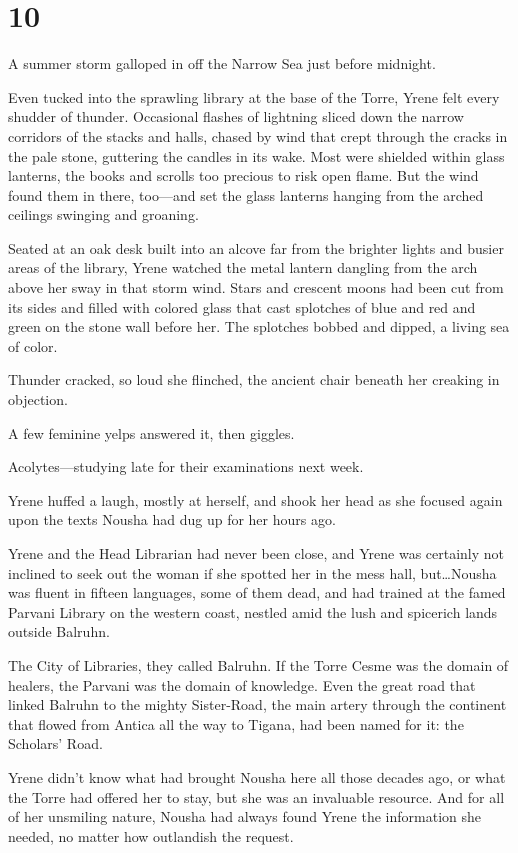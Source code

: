 
\chapter{10}

A summer storm galloped in off the Narrow Sea just before midnight.

Even tucked into the sprawling library at the base of the Torre, Yrene felt every shudder of thunder.
Occasional flashes of lightning sliced down the narrow corridors of the stacks and halls, chased by wind that crept through the cracks in the pale stone, guttering the candles in its wake.
Most were shielded within glass lanterns, the books and scrolls too precious to risk open flame.
But the wind found them in there, too---and set the glass lanterns hanging from the arched ceilings swinging and groaning.

Seated at an oak desk built into an alcove far from the brighter lights and busier areas of the library, Yrene watched the metal lantern dangling from the arch above her sway in that storm wind.
Stars and crescent moons had been cut from its sides and filled with colored glass that cast splotches of blue and red and green on the stone wall before her.
The splotches bobbed and dipped, a living sea of color.

Thunder cracked, so loud she flinched, the ancient chair beneath her creaking in objection.

A few feminine yelps answered it, then giggles.

Acolytes---studying late for their examinations next week.

Yrene huffed a laugh, mostly at herself, and shook her head as she focused again upon the texts Nousha had dug up for her hours ago.

Yrene and the Head Librarian had never been close, and Yrene was certainly not inclined to seek out the woman if she spotted her in the mess hall, but\ldots Nousha was fluent in fifteen languages, some of them dead, and had trained at the famed Parvani Library on the western coast, nestled amid the lush and spicerich lands outside Balruhn.

The City of Libraries, they called Balruhn.
If the Torre Cesme was the domain of healers, the Parvani was the domain of knowledge.
Even the great road that linked Balruhn to the mighty Sister-Road, the main artery through the continent that flowed from Antica all the way to Tigana, had been named for it: the Scholars' Road.

Yrene didn't know what had brought Nousha here all those decades ago, or what the Torre had offered her to stay, but she was an invaluable resource.
And for all of her unsmiling nature, Nousha had always found Yrene the information she needed, no matter how outlandish the request.

